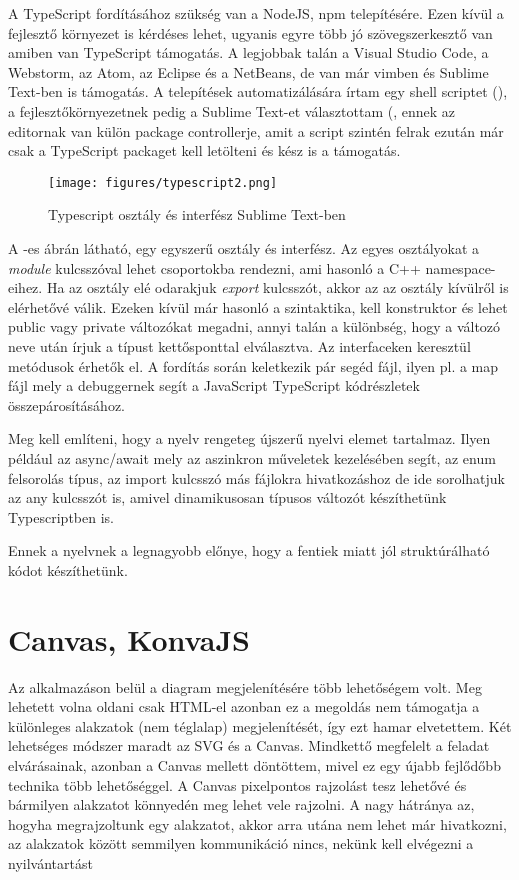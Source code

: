 A TypeScript fordításához szükség van a NodeJS, npm telepítésére. Ezen kívül a fejlesztő környezet is kérdéses lehet, ugyanis egyre több jó szövegszerkesztő van amiben van TypeScript támogatás. 
A legjobbak talán a Visual Studio Code, a Webstorm, az Atom, az Eclipse és a NetBeans, de van már vimben és Sublime Text-ben is támogatás. A telepítések automatizálására írtam egy shell scriptet (), a fejlesztőkörnyezetnek pedig a Sublime Text-et választottam (, ennek az editornak van külön package controllerje, amit a script szintén felrak ezután már csak a TypeScript packaget kell letölteni és kész is a támogatás. 

\begin{figure}[!ht]
\centering
\texttt{[image: figures/typescript2.png]}
\caption{Typescript osztály és interfész Sublime Text-ben} 
\label{fig:TS2}
\end{figure} 

A -es ábrán látható, egy egyszerű osztály és interfész. Az egyes osztályokat a \textit{module} kulcsszóval lehet csoportokba rendezni, ami hasonló a C++ namespace-eihez. Ha az osztály elé odarakjuk \textit{export} kulcsszót, akkor az az osztály kívülről is elérhetővé válik. Ezeken kívül már hasonló a szintaktika, kell konstruktor és lehet public vagy private változókat megadni, annyi talán a különbség, hogy a változó neve után írjuk a típust kettősponttal elválasztva. Az interfaceken keresztül metódusok érhetők el. A fordítás során keletkezik pár segéd fájl, ilyen pl. a map fájl mely a debuggernek segít a JavaScript TypeScript kódrészletek összepárosításához. 

Meg kell említeni, hogy a nyelv rengeteg újszerű nyelvi elemet tartalmaz. Ilyen például az async/await mely az aszinkron műveletek kezelésében segít, az enum felsorolás típus, az import kulcsszó más fájlokra hivatkozáshoz de ide sorolhatjuk az any kulcsszót is, amivel dinamikusosan típusos változót készíthetünk Typescriptben is.

Ennek a nyelvnek a legnagyobb előnye, hogy a fentiek miatt jól struktúrálható kódot készíthetünk.
\section{Canvas, KonvaJS}

Az alkalmazáson belül a diagram megjelenítésére több lehetőségem volt. Meg lehetett volna oldani csak HTML-el azonban ez a megoldás nem támogatja a különleges alakzatok (nem téglalap) megjelenítését, így ezt hamar elvetettem. Két lehetséges módszer maradt az SVG és a Canvas. Mindkettő megfelelt a feladat elvárásainak, azonban a Canvas mellett döntöttem, mivel ez egy újabb fejlődőbb technika több lehetőséggel. A Canvas pixelpontos rajzolást tesz lehetővé és bármilyen alakzatot könnyedén meg lehet vele rajzolni. A nagy hátránya az, hogyha megrajzoltunk egy alakzatot, akkor arra utána nem lehet már hivatkozni, az alakzatok között semmilyen kommunikáció nincs, nekünk kell elvégezni a nyilvántartást

